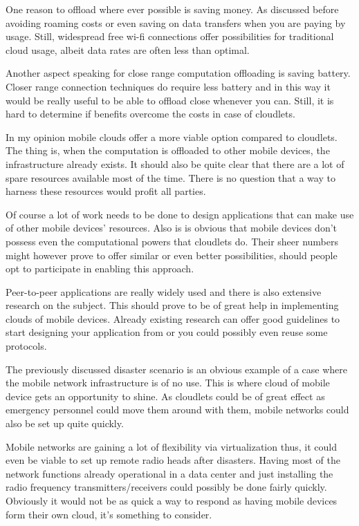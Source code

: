 \documentclass[conference]{IEEEtran}
\begin{document}
\par
One reason to offload where ever possible is saving money. As discussed before avoiding roaming costs or even saving on data transfers when you are paying by usage. Still, widespread free wi-fi connections offer possibilities for traditional cloud usage, albeit data rates are often less than optimal.
\par
Another aspect speaking for close range computation offloading is saving battery.  Closer range connection techniques do require less battery and in this way it would be really useful to be able to offload close whenever you can. Still, it is hard to determine if benefits overcome the costs in case of cloudlets.
\par
In my opinion mobile clouds offer a more viable option compared to cloudlets. The thing is, when the computation is offloaded to other mobile devices, the infrastructure already exists. It should also be quite clear that there are a lot of spare resources available most of the time. There is no question that a way to harness these resources would profit all parties.
\par
Of course a lot of work needs to be done to design applications that can make use of other mobile devices' resources. Also is is obvious that mobile devices don't possess even the computational powers that cloudlets do. Their sheer numbers might however prove to offer similar or even better possibilities, should people opt to participate in enabling this approach.
\par
Peer-to-peer applications are really widely used and there is also extensive research on the subject. This should prove to be of great help in implementing clouds of mobile devices. Already existing research can offer good guidelines to start designing your application from or you could possibly even reuse some protocols.
\par
The previously discussed disaster scenario is an obvious example of a case where the mobile network infrastructure is of no use. This is where cloud of mobile device gets an opportunity to shine. As cloudlets could be of great effect as emergency personnel could move them around with them, mobile networks could also be set up quite quickly.
\par
Mobile networks are gaining a lot of flexibility via virtualization thus, it could even be viable to set up remote radio heads after disasters. Having most of the network functions already operational in a data center and just installing the radio frequency transmitters/receivers could possibly be done fairly quickly. Obviously it would not be as quick a way to respond as having mobile devices form their own cloud, it's something to consider.
\end{document}
